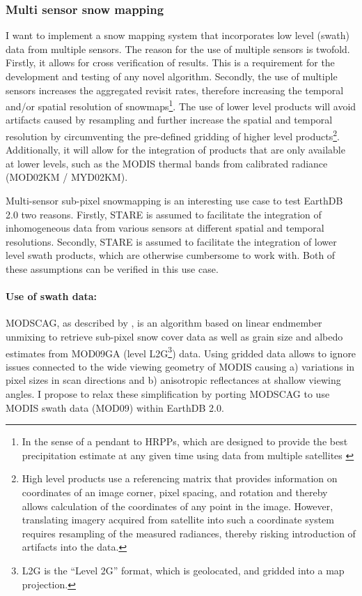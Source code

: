 \documentclass[letterpaper, parskip=half]{scrartcl}
\begin{document}
\subsubsection{Multi sensor snow mapping}
I want to implement a snow mapping system that incorporates low level (swath) data from multiple sensors. The reason for the use of multiple sensors is twofold. Firstly, it allows for cross verification of results. This is a requirement for the development and testing of any novel algorithm. Secondly, the use of multiple sensors increases the aggregated revisit rates, therefore increasing the temporal and/or spatial resolution of snowmaps\footnote{In the sense of a pendant to \glspl{HRPP}, which are designed to provide the best precipitation estimate at any given time using data from multiple satellites \citep{Lettenmaier2015}}.
The use of lower level products will avoid artifacts caused by resampling and further increase the spatial and temporal resolution by circumventing the pre-defined gridding of higher level products\footnote{High level products use a referencing matrix that provides information on coordinates of an image corner, pixel spacing, and rotation and thereby allows calculation of the coordinates of any point in the image. However, translating imagery acquired from satellite into such a coordinate system requires resampling of the measured radiances, thereby risking introduction of artifacts into the data.}. Additionally, it will allow for the integration of products that are only available at lower levels, such as the MODIS thermal bands from calibrated radiance (MOD02KM / MYD02KM).

Multi-sensor sub-pixel snowmapping is an interesting use case to test EarthDB 2.0 two reasons.
Firstly, \gls{STARE} is assumed to facilitate the integration of inhomogeneous data from various sensors at different spatial and temporal resolutions. 
Secondly, \gls{STARE} is assumed to facilitate the integration of lower level swath products, which are otherwise cumbersome to work with. Both of these assumptions can be verified in this use case.

\paragraph{Use of swath data:}
\gls{MODSCAG}, as described by \citep{Painter2009}, is an algorithm based on linear endmember unmixing to retrieve sub-pixel snow cover data as well as grain size and albedo estimates from MOD09GA (level \gls{L2G}\footnote{L2G is the ``Level 2G'' format, which is geolocated, and gridded into a map projection.}) data. 
Using gridded data allows to ignore issues connected to the wide viewing geometry of MODIS causing a) variations in pixel sizes in scan directions and b) anisotropic reflectances at shallow viewing angles. I  propose to relax these simplification by porting MODSCAG to use MODIS swath data (MOD09) within EarthDB 2.0.
\end{document}

